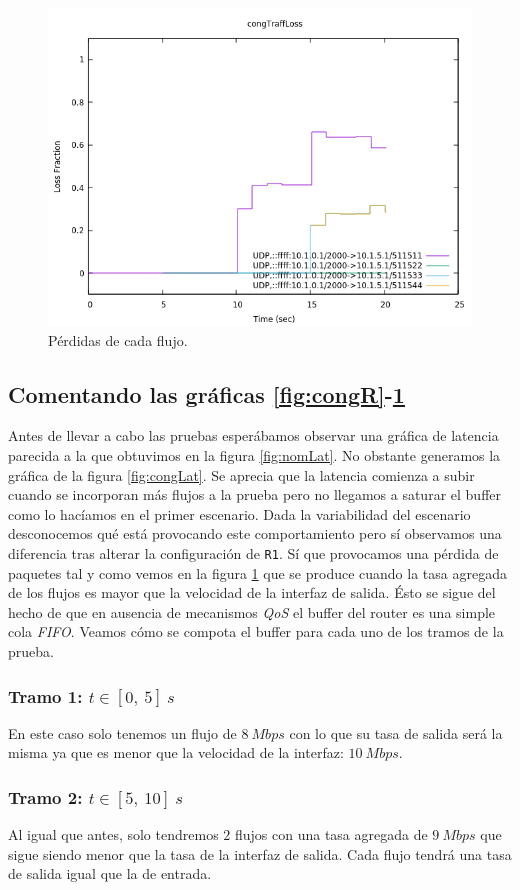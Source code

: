 \documentclass[11pt]{article}
\begin{document}
        \begin{figure}
            \centering
            \includegraphics[width=0.6\linewidth]{congTraffLoss.png}
            \caption{Pérdidas de cada flujo.}
            \label{fig:congLoss}
        \end{figure}

        \subsection{Comentando las gráficas \ref{fig:congR}-\ref{fig:congLoss}}
            Antes de llevar a cabo las pruebas esperábamos observar una gráfica de latencia parecida a la que obtuvimos en la figura \ref{fig:nomLat}. No obstante generamos la gráfica de la figura \ref{fig:congLat}. Se aprecia que la latencia comienza a subir cuando se incorporan más flujos a la prueba pero no llegamos a saturar el buffer como lo hacíamos en el primer escenario. Dada la variabilidad del escenario desconocemos qué está provocando este comportamiento pero sí observamos una diferencia tras alterar la configuración de \texttt{R1}. Sí que provocamos una pérdida de paquetes tal y como vemos en la figura \ref{fig:congLoss} que se produce cuando la tasa agregada de los flujos es mayor que la velocidad de la interfaz de salida. Ésto se sigue del hecho de que en ausencia de mecanismos \textit{QoS} el buffer del router es una simple cola \textit{FIFO}. Veamos cómo se compota el buffer para cada uno de los tramos de la prueba.

            \subsubsection{Tramo 1: $t \in [0,\ 5]\ s$}
                En este caso solo tenemos un flujo de $8\ Mbps$ con lo que su tasa de salida será la misma ya que es menor que la velocidad de la interfaz: $10\ Mbps$.

            \subsubsection{Tramo 2: $t \in [5,\ 10]\ s$}
                Al igual que antes, solo tendremos $2$ flujos con una tasa agregada de $9\ Mbps$ que sigue siendo menor que la tasa de la interfaz de salida. Cada flujo tendrá una tasa de salida igual que la de entrada.
\end{document}
